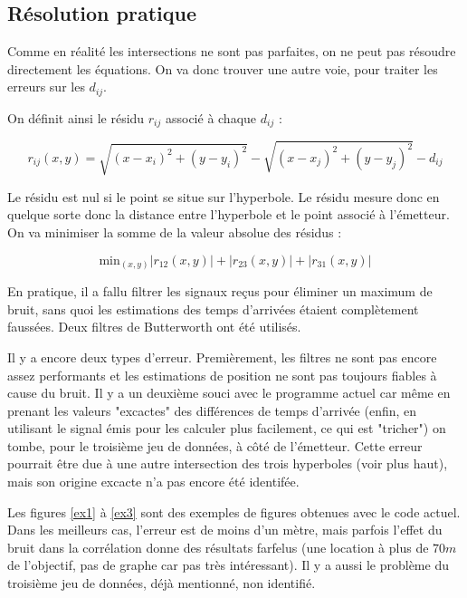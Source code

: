 \documentclass[10pt,a4paper]{article}
\begin{document}
\subsection{Résolution pratique}
Comme en réalité les intersections ne sont pas parfaites, on ne peut pas résoudre directement les équations. On va donc trouver une autre voie, pour traiter les erreurs sur les $d_{ij}$.

On définit ainsi le résidu $r_{ij}$ associé à chaque $d_{ij}$ : 

\begin{equation}
r_{ij}(x,y) = \sqrt{(x-x_i)^2 + (y-y_i)^2} - \sqrt{(x-x_j)^2 + (y-y_j)^2} - d_{ij}
\end{equation}

Le résidu est nul si le point se situe sur l'hyperbole. Le résidu mesure donc en quelque sorte donc la distance entre l'hyperbole et le point associé à l'émetteur. On va minimiser la somme de la valeur absolue des résidus :

\begin{equation}
\mathrm{min}_{(x,y)} | r_{12}(x,y)| + |r_{23} (x,y)| + |r_{31} (x,y)|
\end{equation}

En pratique, il a fallu filtrer les signaux reçus pour éliminer un maximum de bruit, sans quoi les estimations des temps d'arrivées étaient complètement faussées. Deux filtres de Butterworth ont été utilisés.

Il y a encore deux types d'erreur. Premièrement, les filtres ne sont pas encore assez performants et les estimations de position ne sont pas toujours fiables à cause du bruit. Il y a un deuxième souci avec le programme actuel car même en prenant les valeurs "excactes" des différences de temps d'arrivée (enfin, en utilisant le signal émis pour les calculer plus facilement, ce qui est "tricher") on tombe, pour le troisième jeu de données, à côté de l'émetteur. Cette erreur pourrait être due à une autre intersection des trois hyperboles (voir plus haut), mais son origine excacte n'a pas encore été identifée.

Les figures \ref{ex1} à \ref{ex3} sont des exemples de figures obtenues avec le code actuel. Dans les meilleurs cas, l'erreur est de moins d'un mètre, mais parfois l'effet du bruit dans la corrélation donne des résultats farfelus (une location à plus de $70m$ de l'objectif, pas de graphe car pas très intéressant). Il y a aussi le problème du troisième jeu de données, déjà mentionné, non identifié.
\end{document}
